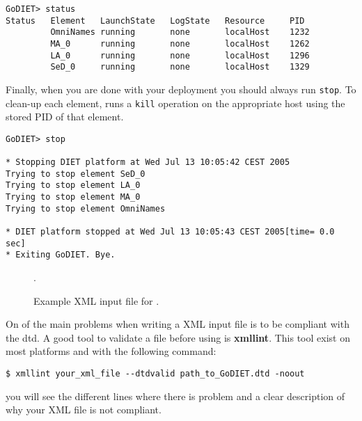 \begin{verbatim}
GoDIET> status
Status   Element   LaunchState   LogState   Resource     PID
         OmniNames running       none       localHost    1232
         MA_0      running       none       localHost    1262
         LA_0      running       none       localHost    1296
         SeD_0     running       none       localHost    1329
\end{verbatim}

Finally, when you are done with your \diet deployment you should always run
\texttt{stop}. To clean-up each element, \godiet runs a \texttt{kill} operation
on the appropriate host using the stored PID of that element.

\begin{verbatim}
GoDIET> stop

* Stopping DIET platform at Wed Jul 13 10:05:42 CEST 2005
Trying to stop element SeD_0
Trying to stop element LA_0
Trying to stop element MA_0
Trying to stop element OmniNames

* DIET platform stopped at Wed Jul 13 10:05:43 CEST 2005[time= 0.0 sec]
* Exiting GoDIET. Bye.
\end{verbatim}

\begin{figure}[p]
.
\caption{Example XML input file for \godiet.\label{fig:godietXml}}
\end{figure}

On of the main problems when writing a \godiet XML input file is to be compliant
with the dtd. A good tool to validate a \godiet file before using \godiet is
\textbf{xmllint}. This tool exist on most platforms and with the following
command:
\begin{verbatim}
$ xmllint your_xml_file --dtdvalid path_to_GoDIET.dtd -noout
\end{verbatim}
you will see the different lines where there is problem and a clear description
of why your XML file is not compliant.

